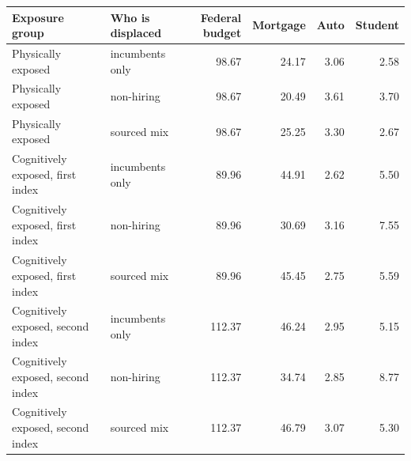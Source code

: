 \begin{tabular}{llrrrr}
\toprule
Exposure group & Who is displaced & Federal budget & Mortgage & Auto & Student \\
\midrule
Physically exposed & incumbents only & 98.67 & 24.17 & 3.06 & 2.58 \\
Physically exposed & non-hiring & 98.67 & 20.49 & 3.61 & 3.70 \\
Physically exposed & sourced mix & 98.67 & 25.25 & 3.30 & 2.67 \\
Cognitively exposed, first index & incumbents only & 89.96 & 44.91 & 2.62 & 5.50 \\
Cognitively exposed, first index & non-hiring & 89.96 & 30.69 & 3.16 & 7.55 \\
Cognitively exposed, first index & sourced mix & 89.96 & 45.45 & 2.75 & 5.59 \\
Cognitively exposed, second index & incumbents only & 112.37 & 46.24 & 2.95 & 5.15 \\
Cognitively exposed, second index & non-hiring & 112.37 & 34.74 & 2.85 & 8.77 \\
Cognitively exposed, second index & sourced mix & 112.37 & 46.79 & 3.07 & 5.30 \\
\bottomrule
\end{tabular}
